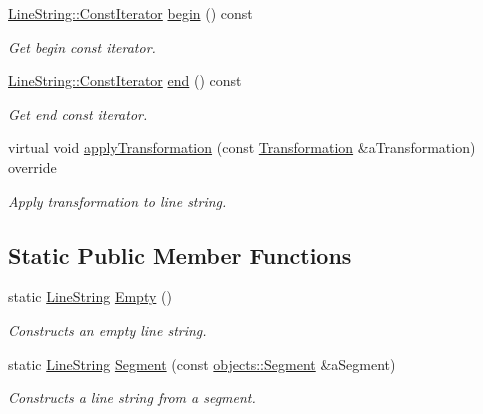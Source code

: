 \begin{DoxyCompactItemize}
\hyperlink{classostk_1_1math_1_1geom_1_1d3_1_1objects_1_1_line_string_a5d184ce7a4ef5613a621f9b628e56de8}{Line\+String\+::\+Const\+Iterator} \hyperlink{classostk_1_1math_1_1geom_1_1d3_1_1objects_1_1_line_string_ae2fe3d5d27963cc67cac8b42dc89369d}{begin} () const
\begin{DoxyCompactList}\small\item\em Get begin const iterator. \end{DoxyCompactList}\item 
\hyperlink{classostk_1_1math_1_1geom_1_1d3_1_1objects_1_1_line_string_a5d184ce7a4ef5613a621f9b628e56de8}{Line\+String\+::\+Const\+Iterator} \hyperlink{classostk_1_1math_1_1geom_1_1d3_1_1objects_1_1_line_string_ae83df237122f545486113c146d483e52}{end} () const
\begin{DoxyCompactList}\small\item\em Get end const iterator. \end{DoxyCompactList}\item 
virtual void \hyperlink{classostk_1_1math_1_1geom_1_1d3_1_1objects_1_1_line_string_a8d1b47e4f9e314a5fc7df353c808dbc2}{apply\+Transformation} (const \hyperlink{classostk_1_1math_1_1geom_1_1d3_1_1_transformation}{Transformation} \&a\+Transformation) override
\begin{DoxyCompactList}\small\item\em Apply transformation to line string. \end{DoxyCompactList}\end{DoxyCompactItemize}
\subsection*{Static Public Member Functions}
\begin{DoxyCompactItemize}
\item 
static \hyperlink{classostk_1_1math_1_1geom_1_1d3_1_1objects_1_1_line_string}{Line\+String} \hyperlink{classostk_1_1math_1_1geom_1_1d3_1_1objects_1_1_line_string_a6b5c3b32f1f029f0948bc4f9f1dacf3b}{Empty} ()
\begin{DoxyCompactList}\small\item\em Constructs an empty line string. \end{DoxyCompactList}\item 
static \hyperlink{classostk_1_1math_1_1geom_1_1d3_1_1objects_1_1_line_string}{Line\+String} \hyperlink{classostk_1_1math_1_1geom_1_1d3_1_1objects_1_1_line_string_a6ebca53757f7c0f7956861245e8efaf8}{Segment} (const \hyperlink{classostk_1_1math_1_1geom_1_1d3_1_1objects_1_1_segment}{objects\+::\+Segment} \&a\+Segment)
\begin{DoxyCompactList}\small\item\em Constructs a line string from a segment. \end{DoxyCompactList}\end{DoxyCompactItemize}


